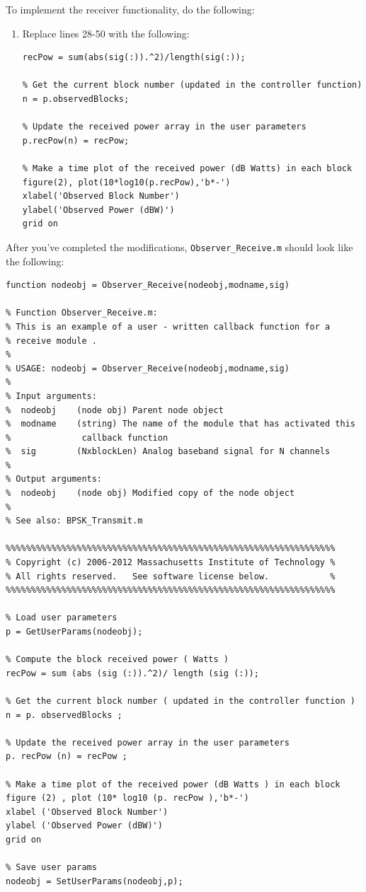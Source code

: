 To implement the receiver functionality, do the following:
\setcounter{enumitemp}{\theenumi}
\begin{enumerate}
\setcounter{enumi}{\theenumitemp}
\item Replace lines 28-50 with the following:
%
\begin{lstlisting}[firstnumber=28]
% Compute the block received power (Watts)
recPow = sum(abs(sig(:)).^2)/length(sig(:));

% Get the current block number (updated in the controller function)
n = p.observedBlocks;

% Update the received power array in the user parameters
p.recPow(n) = recPow;

% Make a time plot of the received power (dB Watts) in each block
figure(2), plot(10*log10(p.recPow),'b*-')
xlabel('Observed Block Number')
ylabel('Observed Power (dBW)')
grid on
\end{lstlisting}
%
\end{enumerate}
After you've completed the modifications, \verb+Observer_Receive.m+ should look like the following:
%
\begin{lstlisting}[firstnumber=1]
function nodeobj = Observer_Receive(nodeobj,modname,sig)

% Function Observer_Receive.m:
% This is an example of a user - written callback function for a
% receive module .
%
% USAGE: nodeobj = Observer_Receive(nodeobj,modname,sig)
%
% Input arguments:
%  nodeobj    (node obj) Parent node object
%  modname    (string) The name of the module that has activated this
%              callback function
%  sig        (NxblockLen) Analog baseband signal for N channels
%
% Output arguments:
%  nodeobj    (node obj) Modified copy of the node object
%
% See also: BPSK_Transmit.m

%%%%%%%%%%%%%%%%%%%%%%%%%%%%%%%%%%%%%%%%%%%%%%%%%%%%%%%%%%%%%%%%%
% Copyright (c) 2006-2012 Massachusetts Institute of Technology %
% All rights reserved.   See software license below.            %
%%%%%%%%%%%%%%%%%%%%%%%%%%%%%%%%%%%%%%%%%%%%%%%%%%%%%%%%%%%%%%%%%

% Load user parameters
p = GetUserParams(nodeobj);

% Compute the block received power ( Watts )
recPow = sum (abs (sig (:)).^2)/ length (sig (:));

% Get the current block number ( updated in the controller function )
n = p. observedBlocks ;

% Update the received power array in the user parameters
p. recPow (n) = recPow ;

% Make a time plot of the received power (dB Watts ) in each block
figure (2) , plot (10* log10 (p. recPow ),'b*-')
xlabel ('Observed Block Number')
ylabel ('Observed Power (dBW)')
grid on

% Save user params
nodeobj = SetUserParams(nodeobj,p);
\end{lstlisting}
%

